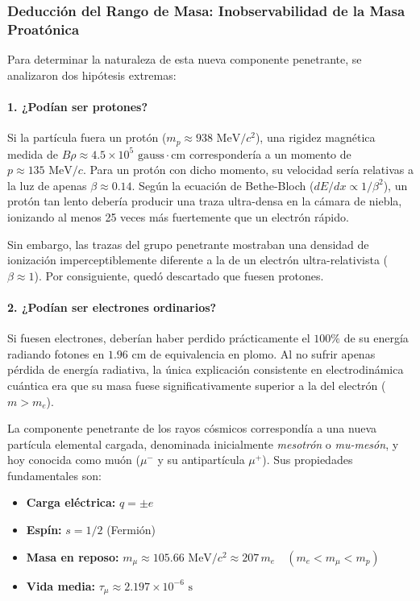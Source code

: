 \newpage
\subsubsection{Deducción del Rango de Masa: Inobservabilidad de la Masa Proatónica}

Para determinar la naturaleza de esta nueva componente penetrante, se analizaron dos hipótesis extremas:

\paragraph{1. ¿Podían ser protones?}
Si la partícula fuera un protón ($m_p \approx 938 \text{ MeV}/c^2$), una rigidez magnética medida de $B\rho \approx 4.5 \times 10^5 \text{ gauss}\cdot\text{cm}$ correspondería a un momento de $p \approx 135 \text{ MeV}/c$.
Para un protón con dicho momento, su velocidad sería relativas a la luz de apenas $\beta \approx 0.14$. Según la ecuación de Bethe-Bloch ($dE/dx \propto 1/\beta^2$), un protón tan lento debería producir una traza ultra-densa en la cámara de niebla, ionizando al menos 25 veces más fuertemente que un electrón rápido. 

Sin embargo, las trazas del grupo penetrante mostraban una densidad de ionización imperceptiblemente diferente a la de un electrón ultra-relativista ($\beta \approx 1$). Por consiguiente, quedó descartado que fuesen protones.

\paragraph{2. ¿Podían ser electrones ordinarios?}
Si fuesen electrones, deberían haber perdido prácticamente el $100\%$ de su energía radiando fotones en $1.96\text{ cm}$ de equivalencia en plomo. Al no sufrir apenas pérdida de energía radiativa, la única explicación consistente en electrodinámica cuántica era que su masa fuese significativamente superior a la del electrón ($m > m_e$).

\begin{definicion}[El Muón]
La componente penetrante de los rayos cósmicos correspondía a una nueva partícula elemental cargada, denominada inicialmente \emph{mesotrón} o \emph{mu-mesón}, y hoy conocida como muón ($\mu^-$ y su antipartícula $\mu^+$).
Sus propiedades fundamentales son:
\begin{itemize}
    \item \textbf{Carga eléctrica:} $q = \pm e$
    \item \textbf{Espín:} $s = 1/2$ (Fermión)
    \item \textbf{Masa en reposo:} $m_\mu \approx 105.66 \text{ MeV}/c^2 \approx 207 \, m_e \quad \left( m_e < m_\mu < m_p \right)$
    \item \textbf{Vida media:} $\tau_\mu \approx 2.197 \times 10^{-6} \text{ s}$
\end{itemize}
\end{definicion}

